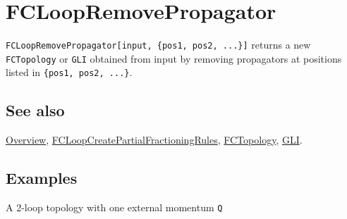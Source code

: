 \documentclass[../FeynCalcManual.tex]{subfiles}
\begin{document}
\hypertarget{fcloopremovepropagator}{
\section{FCLoopRemovePropagator}\label{fcloopremovepropagator}}

\texttt{FCLoopRemovePropagator[\allowbreak{}input,\ \allowbreak{}\{\allowbreak{}pos1,\ \allowbreak{}pos2,\ \allowbreak{}...\}]}
returns a new \texttt{FCTopology} or \texttt{GLI} obtained from input by
removing propagators at positions listed in
\texttt{\{\allowbreak{}pos1,\ \allowbreak{}pos2,\ \allowbreak{}...\}}.

\subsection{See also}

\hyperlink{toc}{Overview},
\hyperlink{fcloopcreatepartialfractioningrules}{FCLoopCreatePartialFractioningRules},
\hyperlink{fctopology}{FCTopology}, \hyperlink{gli}{GLI}.

\subsection{Examples}

A 2-loop topology with one external momentum \texttt{Q}

\begin{Shaded}
\begin{Highlighting}[]
\ExtensionTok{=}\OperatorTok{[}\OperatorTok{,} \OperatorTok{\{}\OperatorTok{[}\OperatorTok{],}\OperatorTok{[}\OperatorTok{],}\OperatorTok{[} \SpecialCharTok{{-}}\SpecialCharTok{{-}}\OperatorTok{],}\OperatorTok{[} \SpecialCharTok{{-}}\OperatorTok{],}\OperatorTok{[} \SpecialCharTok{{-}}\OperatorTok{]\},} \OperatorTok{\{}\OperatorTok{,}\OperatorTok{\},} \OperatorTok{\{}\OperatorTok{\},} \OperatorTok{\{}
    \OperatorTok{[}\OperatorTok{[}\OperatorTok{]]} \OtherTok{{-}\textgreater{}}\OperatorTok{\},} \OperatorTok{\{\}]}
\end{Highlighting}
\end{Shaded}
\end{document}
